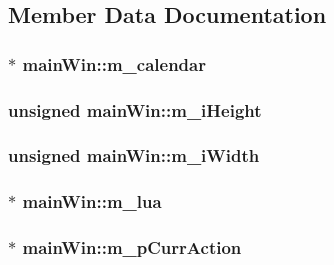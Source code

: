 \subsection{Member Data Documentation}
\hypertarget{classmain_win_a6a02cf853e63c1ad31759f3ce225ed62}{
\subsubsection[{m\-\_\-calendar}]{$\ast$ main\-Win\-::m\-\_\-calendar\hspace{0.3cm}{\ttfamily [private]}}}\label{classmain_win_a6a02cf853e63c1ad31759f3ce225ed62}
\hypertarget{classmain_win_afaa8e85eaf3926a8aa141bfc1b2c0c01}{
\subsubsection[{m\-\_\-i\-Height}]{\setlength{\rightskip}{0pt plus 5cm}unsigned main\-Win\-::m\-\_\-i\-Height\hspace{0.3cm}{\ttfamily [private]}}}\label{classmain_win_afaa8e85eaf3926a8aa141bfc1b2c0c01}
\hypertarget{classmain_win_a698988f67b0f686dba0a8e33187f66a1}{
\subsubsection[{m\-\_\-i\-Width}]{\setlength{\rightskip}{0pt plus 5cm}unsigned main\-Win\-::m\-\_\-i\-Width\hspace{0.3cm}{\ttfamily [private]}}}\label{classmain_win_a698988f67b0f686dba0a8e33187f66a1}
\hypertarget{classmain_win_a96b71dd9a31a4cf6ea5db224a4540458}{
\subsubsection[{m\-\_\-lua}]{$\ast$ main\-Win\-::m\-\_\-lua\hspace{0.3cm}{\ttfamily [private]}}}\label{classmain_win_a96b71dd9a31a4cf6ea5db224a4540458}
\hypertarget{classmain_win_a426c3fc67264577231b3deb525ddef99}{
\subsubsection[{m\-\_\-p\-Curr\-Action}]{$\ast$ main\-Win\-::m\-\_\-p\-Curr\-Action\hspace{0.3cm}{\ttfamily [private]}}}\label{classmain_win_a426c3fc67264577231b3deb525ddef99}
